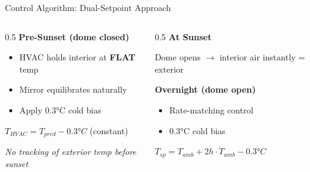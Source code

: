 \documentclass[aspectratio=169,11pt]{beamer}
\begin{document}
\begin{frame}{Control Algorithm: Dual-Setpoint Approach}

\begin{columns}
\begin{column}{0.5\textwidth}
\textbf{Pre-Sunset (dome closed)}

\vspace{0.5em}

\begin{itemize}
    \item HVAC holds interior at \textbf{FLAT} temp
    \item Mirror equilibrates naturally
    \item Apply 0.3°C cold bias
\end{itemize}

\vspace{0.5em}

$T_{HVAC} = T_{pred} - 0.3°C$ (constant)

\vspace{0.5em}

\small\textit{No tracking of exterior temp before sunset}
\end{column}

\begin{column}{0.5\textwidth}
\textbf{At Sunset}

Dome opens $\to$ interior air instantly = exterior

\vspace{0.5em}

\textbf{Overnight (dome open)}

\begin{itemize}
    \item Rate-matching control
    \item 0.3°C cold bias
\end{itemize}

\vspace{0.5em}

$T_{sp} = T_{amb} + 2h \cdot \dot{T}_{amb} - 0.3°C$
\end{column}
\end{columns}

\end{frame}
\end{document}
